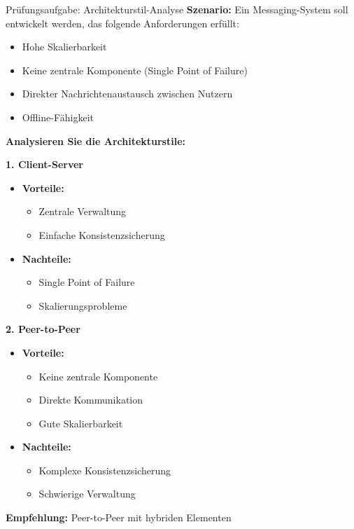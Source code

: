 \begin{example2}{Prüfungsaufgabe: Architekturstil-Analyse}
\textbf{Szenario:}
Ein Messaging-System soll entwickelt werden, das folgende Anforderungen erfüllt:
\begin{itemize}
    \item Hohe Skalierbarkeit
    \item Keine zentrale Komponente (Single Point of Failure)
    \item Direkter Nachrichtenaustausch zwischen Nutzern
    \item Offline-Fähigkeit
\end{itemize}

\textbf{Analysieren Sie die Architekturstile:}

\textbf{1. Client-Server}
\begin{itemize}
    \item \textbf{Vorteile:}
    \begin{itemize}
        \item Zentrale Verwaltung
        \item Einfache Konsistenzsicherung
    \end{itemize}
    \item \textbf{Nachteile:}
    \begin{itemize}
        \item Single Point of Failure
        \item Skalierungsprobleme
    \end{itemize}
\end{itemize}

\textbf{2. Peer-to-Peer}
\begin{itemize}
    \item \textbf{Vorteile:}
    \begin{itemize}
        \item Keine zentrale Komponente
        \item Direkte Kommunikation
        \item Gute Skalierbarkeit
    \end{itemize}
    \item \textbf{Nachteile:}
    \begin{itemize}
        \item Komplexe Konsistenzsicherung
        \item Schwierige Verwaltung
    \end{itemize}
\end{itemize}

\textbf{Empfehlung:} Peer-to-Peer mit hybriden Elementen
\end{example2}

